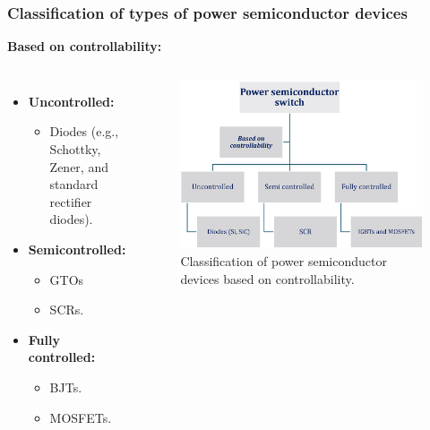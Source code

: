 \begin{frame}
	\frametitle{Classification of types of power semiconductor devices}
    \textbf{Based on controllability:}
    \begin{columns}
        \begin{itemize}
            \item \textbf{Uncontrolled:}
            \begin{itemize}
                \item Diodes (e.g., Schottky, Zener, and standard rectifier diodes).
            \end{itemize}
            \item \textbf{Semicontrolled:}
            \begin{itemize}
                \item GTOs
                \item SCRs.
            \end{itemize}
            \item \textbf{Fully controlled:}
            \begin{itemize}
                \item BJTs.
                \item MOSFETs.
            \end{itemize}
        \end{itemize}

        \begin{figure}
            \centering
            \label{fig:Classification_based_on_controllability}
            \includegraphics[scale=0.35]{fig/lec04/classification_of_device_3.eps}
            \caption{Classification of power semiconductor devices based on controllability.}
        \end{figure}
    \end{columns}
\end{frame}


